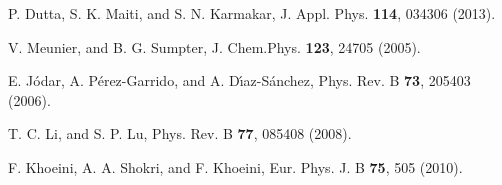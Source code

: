 \documentclass[twocolumn,superscriptaddress]{revtex4}%
\begin{document}
\begin{thebibliography}{99}
P. Dutta, S. K. Maiti, and S. N. Karmakar, J. Appl. Phys.
\textbf{114}, 034306 (2013).

V. Meunier, and B. G. Sumpter, J. Chem.Phys. \textbf{123},
24705 (2005).

E. J\'{o}dar, A. P\'{e}rez-Garrido, and A.
D\'{\i}az-S\'{a}nchez, Phys. Rev. B \textbf{73}, 205403 (2006).

T. C. Li, and S. P. Lu, Phys. Rev. B \textbf{77},
085408 (2008).

F. Khoeini, A. A. Shokri, and F. Khoeini, Eur. Phys.
J. B \textbf{75}, 505 (2010).
\end{thebibliography}
\end{document}
